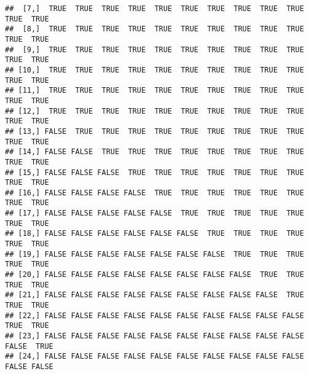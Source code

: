 \documentclass[
]{article}
\begin{document}
\begin{verbatim}
##  [7,]  TRUE  TRUE  TRUE  TRUE  TRUE  TRUE  TRUE  TRUE  TRUE  TRUE  TRUE  TRUE
##  [8,]  TRUE  TRUE  TRUE  TRUE  TRUE  TRUE  TRUE  TRUE  TRUE  TRUE  TRUE  TRUE
##  [9,]  TRUE  TRUE  TRUE  TRUE  TRUE  TRUE  TRUE  TRUE  TRUE  TRUE  TRUE  TRUE
## [10,]  TRUE  TRUE  TRUE  TRUE  TRUE  TRUE  TRUE  TRUE  TRUE  TRUE  TRUE  TRUE
## [11,]  TRUE  TRUE  TRUE  TRUE  TRUE  TRUE  TRUE  TRUE  TRUE  TRUE  TRUE  TRUE
## [12,]  TRUE  TRUE  TRUE  TRUE  TRUE  TRUE  TRUE  TRUE  TRUE  TRUE  TRUE  TRUE
## [13,] FALSE  TRUE  TRUE  TRUE  TRUE  TRUE  TRUE  TRUE  TRUE  TRUE  TRUE  TRUE
## [14,] FALSE FALSE  TRUE  TRUE  TRUE  TRUE  TRUE  TRUE  TRUE  TRUE  TRUE  TRUE
## [15,] FALSE FALSE FALSE  TRUE  TRUE  TRUE  TRUE  TRUE  TRUE  TRUE  TRUE  TRUE
## [16,] FALSE FALSE FALSE FALSE  TRUE  TRUE  TRUE  TRUE  TRUE  TRUE  TRUE  TRUE
## [17,] FALSE FALSE FALSE FALSE FALSE  TRUE  TRUE  TRUE  TRUE  TRUE  TRUE  TRUE
## [18,] FALSE FALSE FALSE FALSE FALSE FALSE  TRUE  TRUE  TRUE  TRUE  TRUE  TRUE
## [19,] FALSE FALSE FALSE FALSE FALSE FALSE FALSE  TRUE  TRUE  TRUE  TRUE  TRUE
## [20,] FALSE FALSE FALSE FALSE FALSE FALSE FALSE FALSE  TRUE  TRUE  TRUE  TRUE
## [21,] FALSE FALSE FALSE FALSE FALSE FALSE FALSE FALSE FALSE  TRUE  TRUE  TRUE
## [22,] FALSE FALSE FALSE FALSE FALSE FALSE FALSE FALSE FALSE FALSE  TRUE  TRUE
## [23,] FALSE FALSE FALSE FALSE FALSE FALSE FALSE FALSE FALSE FALSE FALSE  TRUE
## [24,] FALSE FALSE FALSE FALSE FALSE FALSE FALSE FALSE FALSE FALSE FALSE FALSE
\end{verbatim}
\end{document}
